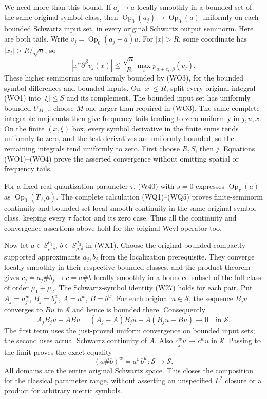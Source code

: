 \documentclass[
  11pt,
]{article}
\begin{document}
We need more than this bound. If \(a_j\to a\) locally smoothly in a
bounded set of the same original symbol class, then
\(\operatorname{Op}_0(a_j)\to\operatorname{Op}_0(a)\) uniformly on each
bounded Schwartz input set, in every original Schwartz output seminorm.
Here are both tails. Write \(v_j=\operatorname{Op}_0(a_j-a)u\). For
\(|x|>R\), some coordinate has \(|x_i|>R/\sqrt n\), so \[
 |x^\alpha\partial^\beta v_j(x)|
 \leq\frac{\sqrt n}{R}
             \max_i p_{\alpha+e_i,\beta}(v_j).
 \tag{WO4}
\] These higher seminorms are uniformly bounded by (WO3), for the
bounded symbol differences and bounded inputs. On \(|x|\leq R\), split
every original integral (WO1) into \(|\xi|\leq S\) and its complement.
The bounded input set has uniformly bounded \(U_{M,\omega}\); choose
\(M\) one larger than required in (WO3). The same complete integrable
majorants then give frequency tails tending to zero uniformly in
\(j,u,x\). On the finite \((x,\xi)\) box, every symbol derivative in the
finite sums tends uniformly to zero, and the test derivatives are
uniformly bounded, so the remaining integrals tend uniformly to zero.
First choose \(R,S\), then \(j\). Equations (WO1)--(WO4) prove the
asserted convergence without omitting spatial or frequency tails.

For a fixed real quantization parameter \(\tau\), (W40) with \(s=0\)
expresses \(\operatorname{Op}_\tau(a)\) as
\(\operatorname{Op}_0(T_{A_\tau}a)\). The complete calculation
(WQ1)--(WQ5) proves finite-seminorm continuity and bounded-set local
smooth continuity in the same original symbol class, keeping every
\(\tau\) factor and its zero case. Thus all the continuity and
convergence assertions above hold for the original Weyl operator too.

Now let \(a\in S^{\mu_1}_{\rho,\delta}\),
\(b\in S^{\mu_2}_{\rho,\delta}\) in (WX1). Choose the original bounded
compactly supported approximants \(a_j,b_j\) from the localization
prerequisite. They converge locally smoothly in their respective bounded
classes, and the product theorem gives \(c_j=a_j\#b_j\to c=a\#b\)
locally smoothly in a bounded subset of the full class of order
\(\mu_1+\mu_2\). The Schwartz-symbol identity (W27) holds for each pair.
Put \(A_j=a_j^w\), \(B_j=b_j^w\), \(A=a^w\), \(B=b^w\). For each
original \(u\in\mathcal S\), the sequence \(B_ju\) converges to \(Bu\)
in \(\mathcal S\) and hence is bounded there. Consequently \[
 A_jB_ju-ABu=(A_j-A)B_ju+A(B_ju-Bu)\longrightarrow0
                     \quad\text{in }\mathcal S.
 \tag{WO5}
\] The first term uses the just-proved uniform convergence on bounded
input sets; the second uses actual Schwartz continuity of \(A\). Also
\(c_j^wu\to c^wu\) in \(\mathcal S\). Passing to the limit proves the
exact equality \[
 (a\#b)^w=a^wb^w:\mathcal S\longrightarrow\mathcal S.
 \tag{WO6}
\] All domains are the entire original Schwartz space. This closes the
composition for the classical parameter range, without asserting an
unspecified \(L^2\) closure or a product for arbitrary metric symbols.
\end{document}
